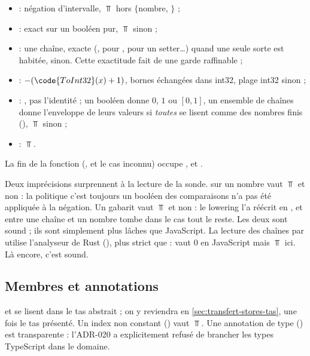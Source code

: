 \begin{itemize}
  \item {} : négation d'intervalle, $\Top$ hors $\{$nombre,
    $\}$ ;
  \item {} : exact sur un booléen pur, $\Top$ sinon ;
  \item {} : une chaîne, exacte (,
     pour ,  pour un setter\ldots)
    quand une seule sorte est habitée,  sinon. Cette exactitude
    fait de  une garde raffinable ;
  \item {} : $-(\code{ToInt32}(x) + 1)$, bornes échangées dans int32,
    plage int32 sinon ;
  \item {} : , pas l'identité ; un booléen donne $0$,
    $1$ ou $[0,1]$, un ensemble de chaînes donne l'enveloppe de leurs
    valeurs si \emph{toutes} se lisent comme des nombres finis
    (), $\Top$ sinon ;
  \item {} : $\Top$.
\end{itemize}
La fin de la fonction (\code{~}, \code{+} et le cas inconnu) occupe
, et
 .

\begin{piege}
  Deux imprécisions surprennent à la lecture de la sonde.  sur un
  nombre vaut $\Top$ et non  : la politique \og c'est toujours
  un booléen\fg{} des comparaisons n'a pas été appliquée à la négation. Un
  gabarit  vaut $\Top$ et non  : le lowering l'a
  réécrit en , et \code{+} entre une chaîne et un nombre
  tombe dans le cas \og tout le reste\fg{}. Les deux sont sound ; ils sont
  simplement plus lâches que JavaScript. La lecture des chaînes par
   utilise l'analyseur de Rust
  (), plus strict que  : 
  vaut $0$ en JavaScript mais $\Top$ ici. Là encore, c'est sound.
\end{piege}

\subsection{Membres et annotations}

 et  se lisent dans le tas abstrait ; on y reviendra
en \cref{sec:transfert-stores-tas}, une fois le tas présenté. Un index non
constant () vaut $\Top$. Une annotation de type
() est transparente : l'ADR-020 a explicitement refusé de
brancher les types TypeScript dans le domaine.

